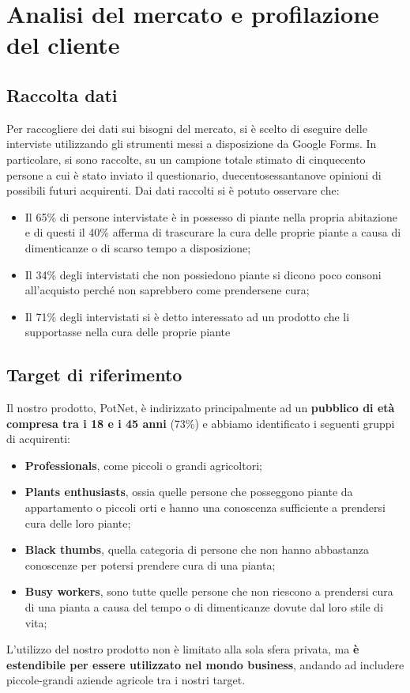 \section{Analisi del mercato e profilazione del cliente}

\subsection{Raccolta dati}

Per raccogliere dei dati sui bisogni del mercato, si è scelto di eseguire delle interviste utilizzando gli strumenti messi a disposizione da Google Forms. In particolare, si sono raccolte, su un campione totale stimato di cinquecento persone a cui è stato inviato il questionario, duecentosessantanove opinioni di possibili futuri acquirenti.
Dai dati raccolti si è potuto osservare che:

\begin{itemize}
	\item Il 65\% di persone intervistate è in possesso di piante nella propria abitazione e di questi il 40\% afferma di trascurare la cura delle proprie piante a causa di dimenticanze o di scarso tempo a disposizione;
	
	\item Il 34\% degli intervistati che non possiedono piante si dicono poco consoni all’acquisto perché non saprebbero come prendersene cura;
	
	\item Il 71\% degli intervistati si è detto interessato ad un prodotto che li supportasse nella cura delle proprie piante
\end{itemize}

\subsection{Target di riferimento}

Il nostro prodotto, PotNet, è indirizzato principalmente ad un \textbf{pubblico di età compresa tra i 18 e i 45 anni} (73\%) e abbiamo identificato i seguenti gruppi di acquirenti:

\begin{itemize}
	\item \textbf{Professionals}, come piccoli o grandi agricoltori;
	
	\item \textbf{Plants enthusiasts}, ossia quelle persone che posseggono piante da appartamento o piccoli orti e hanno una conoscenza sufficiente a prendersi cura delle loro piante;	
	
	\item \textbf{Black thumbs}, quella categoria di persone che non hanno abbastanza conoscenze per potersi prendere cura di una pianta;
	
	\item \textbf{Busy workers}, sono tutte quelle persone che non riescono a prendersi cura di una pianta a causa del tempo o di dimenticanze dovute dal loro stile di vita;
\end{itemize}

L’utilizzo del nostro prodotto non è limitato alla sola sfera privata, ma \textbf{è estendibile per essere utilizzato nel mondo business}, andando ad includere piccole-grandi aziende agricole tra i nostri target.